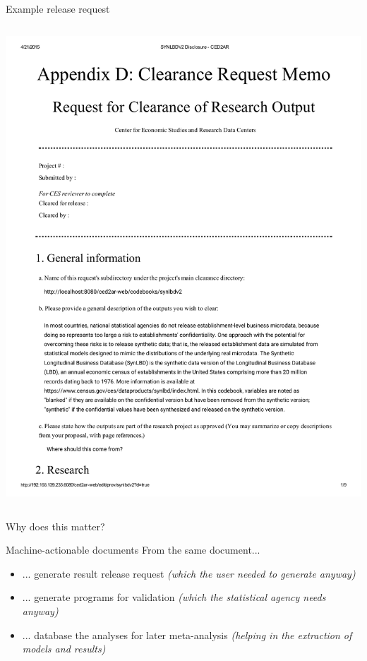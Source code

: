 \begin{frame}{Example release request}
\begin{columns}[T]
\begin{column}{0.49\textwidth}
\includegraphics[width=\textwidth]{SYNLBDV2_Disclosure_CED2AR.pdf}
\end{column}
\end{columns}
\end{frame}

\begin{frame}{Why does this matter?}
\begin{block}{Machine-actionable documents}
From the same document...
\begin{itemize}[<+->]
\item ... generate result release request  \textit{(which the user needed to generate anyway)}
\item ... generate programs for validation \textit{ (which the statistical agency needs anyway)}
\item ... database the analyses for later meta-analysis \textit{(helping in the extraction of models 
and 
results)}
\end{itemize}
\end{block}
\end{frame}


